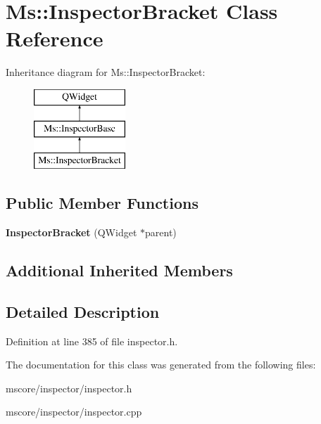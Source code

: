 \hypertarget{class_ms_1_1_inspector_bracket}{}\section{Ms\+:\+:Inspector\+Bracket Class Reference}
\label{class_ms_1_1_inspector_bracket}
Inheritance diagram for Ms\+:\+:Inspector\+Bracket\+:\begin{figure}[H]
\begin{center}
\leavevmode
\includegraphics[height=3.000000cm]{class_ms_1_1_inspector_bracket}
\end{center}
\end{figure}
\subsection*{Public Member Functions}
\begin{DoxyCompactItemize}
\item 
\mbox{\label{class_ms_1_1_inspector_bracket_ae65167a3360d96ff561a1a37f7c40543}} 
{\bfseries Inspector\+Bracket} (Q\+Widget $\ast$parent)
\end{DoxyCompactItemize}
\subsection*{Additional Inherited Members}


\subsection{Detailed Description}


Definition at line 385 of file inspector.\+h.



The documentation for this class was generated from the following files\+:\begin{DoxyCompactItemize}
\item 
mscore/inspector/inspector.\+h\item 
mscore/inspector/inspector.\+cpp\end{DoxyCompactItemize}
